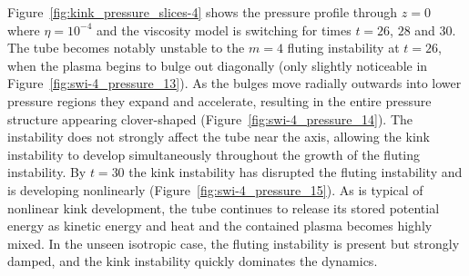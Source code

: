 Figure~\ref{fig:kink_pressure_slices-4} shows the pressure profile through $z=0$ where $\eta=10^{-4}$ and the viscosity model is switching for times $t=26$, $28$ and $30$. The tube becomes notably unstable to the $m=4$ fluting instability at $t=26$, when the plasma begins to bulge out diagonally (only slightly noticeable in Figure~\ref{fig:swi-4_pressure_13}). As the bulges move radially outwards into lower pressure regions they expand and accelerate, resulting in the entire pressure structure appearing clover-shaped (Figure~\ref{fig:swi-4_pressure_14}). The instability does not strongly affect the tube near the axis, allowing the kink instability to develop simultaneously throughout the growth of the fluting instability. By $t=30$ the kink instability has disrupted the fluting instability and is developing nonlinearly (Figure~\ref{fig:swi-4_pressure_15}). As is typical of nonlinear kink development, the tube continues to release its stored potential energy as kinetic energy and heat and the contained plasma becomes highly mixed. In the unseen isotropic case, the fluting instability is present but strongly damped, and the kink instability quickly dominates the dynamics.


